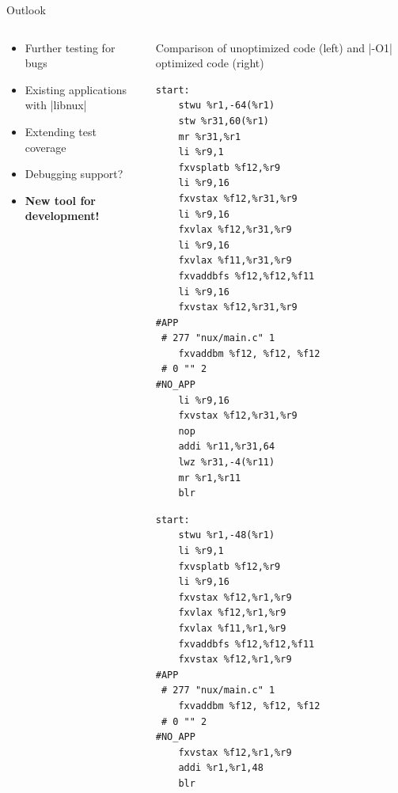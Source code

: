\documentclass[10pt,aspectratio=169]{beamer}
\begin{document}
\begin{frame}[fragile]{Outlook}
    \begin{columns}[c]
    \begin{column}{0.4\textwidth}
		\begin{itemize}[<2->]
			\setlength\itemsep{1em}
			\item Further testing for bugs
			\item Existing applications with |libnux|
			\item Extending test coverage
			\item Debugging support?
			\item<2-> \textbf{New tool for development!}
        \end{itemize}
    \end{column}

    \begin{column}{0.6\textwidth}
        \centering
		\scriptsize Comparison of unoptimized code (left) and |-O1| optimized code (right)
            \begin{adjustbox}{center, max width={1\columnwidth}}
			\begin{lstlisting}[basicstyle=\ttfamily\tiny\color{darkblue}]
start:
	stwu %r1,-64(%r1)
	stw %r31,60(%r1)
	mr %r31,%r1
	li %r9,1
	fxvsplatb %f12,%r9
	li %r9,16
	fxvstax %f12,%r31,%r9
	li %r9,16
	fxvlax %f12,%r31,%r9
	li %r9,16
	fxvlax %f11,%r31,%r9
	fxvaddbfs %f12,%f12,%f11
	li %r9,16
	fxvstax %f12,%r31,%r9
#APP
 # 277 "nux/main.c" 1
	fxvaddbm %f12, %f12, %f12
 # 0 "" 2
#NO_APP
	li %r9,16
	fxvstax %f12,%r31,%r9
	nop
	addi %r11,%r31,64
	lwz %r31,-4(%r11)
	mr %r1,%r11
	blr
			\end{lstlisting}
			\hspace*{2em}
			\begin{lstlisting}[basicstyle=\ttfamily\tiny\color{darkblue}]
start:
	stwu %r1,-48(%r1)
	li %r9,1
	fxvsplatb %f12,%r9
	li %r9,16
	fxvstax %f12,%r1,%r9
	fxvlax %f12,%r1,%r9
	fxvlax %f11,%r1,%r9
	fxvaddbfs %f12,%f12,%f11
	fxvstax %f12,%r1,%r9
#APP
 # 277 "nux/main.c" 1
	fxvaddbm %f12, %f12, %f12
 # 0 "" 2
#NO_APP
	fxvstax %f12,%r1,%r9
	addi %r1,%r1,48
	blr
			\end{lstlisting}
            \end{adjustbox}
    \end{column}
    \end{columns}
\end{frame}
\end{document}
